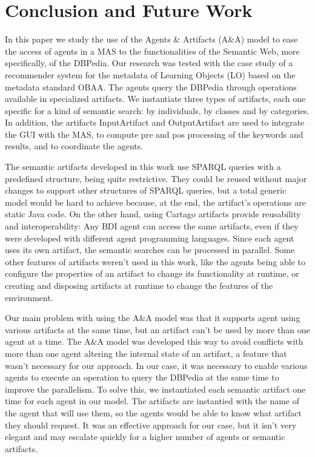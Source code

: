\documentclass[a4paper,twoside]{article}
\begin{document}
\section{Conclusion and Future Work}

\noindent In this paper we study the use of the Agents \& Artifacts (A\&A) model to ease the access of agents in a MAS to the functionalities of the Semantic Web, more specifically, of the DBPedia. Our research was tested with the case study of a recommender system for the metadata of Learning Objects (LO) based on the metadata standard OBAA. The agents query the DBPedia through operations available in specialized artifacts. We instantiate three types of artifacts, each one specific for a kind of semantic search: by individuals, by classes and by categories. In addition, the artifacts InputArtifact and OutputArtifact are used to integrate the GUI with the MAS, to compute pre and pos processing of the keywords and results, and to coordinate the agents.

The semantic artifacts developed in this work use SPARQL queries with a predefined structure, being quite restrictive. They could be reused without major changes to support other structures of SPARQL queries, but a total generic model would be hard to achieve because, at the end, the artifact's operations are static Java code. On the other hand, using Cartago artifacts provide reusability and interoperability: Any BDI agent can access the same artifacts, even if they were developed with different agent programming languages. Since each agent uses its own artifact, the semantic searches can be processed in parallel. Some other features of artifacts weren't used in this work, like the agents being able to configure the properties of an artifact to change its functionality at runtime, or creating and disposing artifacts at runtime to change the features of the environment.

Our main problem with using the A\&A model was that it supports agent using various artifacts at the same time, but an artifact can't be used by more than one agent at a time. The A\&A model was developed this way to avoid conflicts with more than one agent altering the internal state of an artifact, a feature that wasn't necessary for our approach. In our case, it was necessary to enable various agents to execute an operation to query the DBPedia at the same time to improve the parallelism. To solve this, we instantiated each semantic artifact one time for each agent in our model. The artifacts are instantied with the name of the agent that will use them, so the agents would be able to know what artifact they should request. It was an effective approach for our case, but it isn't very elegant and may escalate quickly for a higher number of agents or semantic artifacts.
\end{document}
